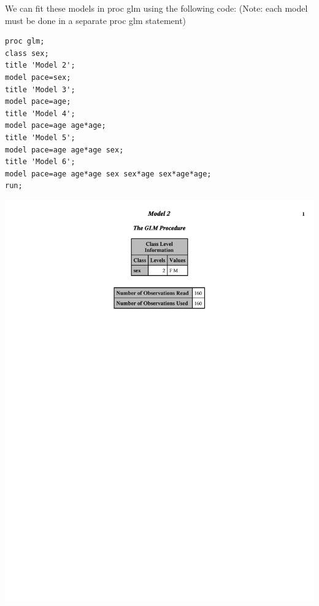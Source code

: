 We can fit these models in proc glm using the following code: (Note: each model must be done in a separate proc glm statement)
\begin{small}
\begin{verbatim}
proc glm;
class sex;
title 'Model 2';
model pace=sex;
title 'Model 3';
model pace=age;
title 'Model 4';
model pace=age age*age;
title 'Model 5';
model pace=age age*age sex;
title 'Model 6';
model pace=age age*age sex sex*age sex*age*age;
run;
\end{verbatim}
\end{small}


\begin{center}
\includegraphics[scale=0.8,page=2,trim=5mm 85mm 5mm 5mm]{ResRunGLM.pdf}

\end{center}
